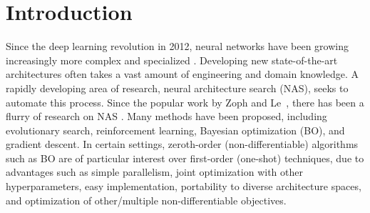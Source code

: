 \documentclass[11pt]{article}
\numberwithin{equation}{section}
\numberwithin{figure}{section}
\theoremstyle{plain}
\theoremstyle{definition}
\let\citep\cite
\begin{document}
\begin{comment}


Over the past half-decade, many methods have been considered for neural architecture search (NAS). Bayesian optimization (BO), which has long had success in hyperparameter optimization, has recently emerged as a very promising strategy for NAS when it is coupled with a neural predictor. Recent work has proposed different instantiations of this framework, for example, using Bayesian neural networks or graph convolutional networks as the predictive model within BO. However, the analyses in these papers often focus on the full-fledged NAS algorithm, so it is difficult to tell which individual components of the framework lead to the best performance.

In this work, we give a thorough analysis of the ``BO + neural predictor'' framework by identifying five main components: the architecture encoding, neural predictor, uncertainty calibration method, acquisition function, and acquisition optimization strategy. We test several different methods for each component and also develop a novel path-based encoding scheme for neural architectures, which we show theoretically and empirically scales better than other encodings. Using all of our analyses, we develop a final algorithm called BANANAS, which achieves state-of-the-art performance on NAS search spaces. We adhere to the NAS research checklist (Lindauer and Hutter 2019) to facilitate best practices, and our code is available at https://github.com/naszilla/naszilla.


\end{comment}



 
\section{Introduction}
\label{sec:introduction}

Since the deep learning revolution in 2012, neural networks have been growing increasingly more complex and specialized \cite{alexnet, densenet, szegedy2017inception}.
Developing new state-of-the-art architectures often takes a vast amount of engineering and domain knowledge.
A rapidly developing area of research, neural architecture search (NAS), 
seeks to automate this process.
Since the popular work by 
Zoph and Le~\citep{zoph2017neural}, 
there has been a flurry of research on NAS
\cite{pnas, enas, darts, nasbot, nas-survey, auto-keras}.
Many methods have been proposed, including evolutionary search, 
reinforcement learning, Bayesian optimization (BO), and gradient descent.
In certain settings, zeroth-order (non-differentiable) algorithms
such as BO are of particular interest over first-order (one-shot)
techniques, due to advantages such as simple parallelism, 
joint optimization with other hyperparameters,
easy implementation, portability to diverse architecture spaces,
and optimization of other/multiple non-differentiable objectives.
\end{document}
